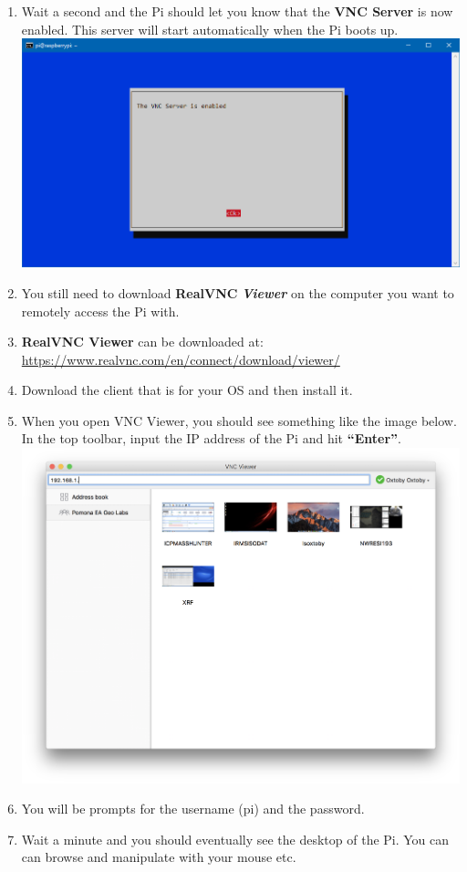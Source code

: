 \documentclass{article}
\begin{document}
\begin{enumerate}
  \item Wait a second and the Pi should let you know that the \textbf{VNC Server} is now enabled. This server will start automatically when the Pi boots up.
  \newline
  \newline
  \includegraphics[width=1.00\textwidth]{rcvncconf}
  \item You still need to download \textbf{RealVNC} \textbf{\textit{Viewer}} on the computer you want to remotely access the Pi with.
  \item \textbf{RealVNC Viewer} can be downloaded at:
  \newline
  \url{https://www.realvnc.com/en/connect/download/viewer/}%
  \item Download the client that is for your OS and then install it.  
  \item When you open VNC Viewer, you should see something like the image below. In the top toolbar, input the IP address of the Pi and hit \textbf{``Enter''}.
  \includegraphics[width=1.00\textwidth]{realvnc}
  \item You will be prompts for the username (pi) and the password.
  \item Wait a minute and you should eventually see the desktop of the Pi. You can can browse and manipulate with your mouse etc.
\end{enumerate}
\end{document}
